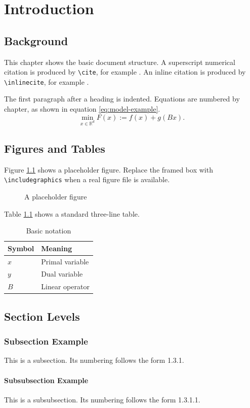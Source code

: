 \chapter{Introduction}

\section{Background}

This chapter shows the basic document structure. A superscript numerical citation is produced by \verb|\cite|, for example \cite{sample-journal}. An inline citation is produced by \verb|\inlinecite|, for example .

The first paragraph after a heading is indented. Equations are numbered by chapter, as shown in equation \eqref{eq:model-example}.
\begin{equation}\label{eq:model-example}
  \min_{x\in\mathbb{R}^{d}} F(x) := f(x)+g(Bx).
\end{equation}

\section{Figures and Tables}

Figure \ref{fig:placeholder} shows a placeholder figure. Replace the framed box with \verb|\includegraphics| when a real figure file is available.
\begin{figure}[htbp]
  \centering
  \fbox{\rule{0pt}{35mm}\rule{80mm}{0pt}}
  \caption{A placeholder figure}
  \label{fig:placeholder}
\end{figure}

Table \ref{tab:notation} shows a standard three-line table.
\begin{table}[htbp]
  \centering
  \caption{Basic notation}
  \label{tab:notation}
  \begin{tabular}{ll}
    \toprule
    Symbol & Meaning \\
    \midrule
    $x$ & Primal variable \\
    $y$ & Dual variable \\
    $B$ & Linear operator \\
    \bottomrule
  \end{tabular}
\end{table}

\section{Section Levels}

\subsection{Subsection Example}

This is a subsection. Its numbering follows the form 1.3.1.

\subsubsection{Subsubsection Example}

This is a subsubsection. Its numbering follows the form 1.3.1.1.
